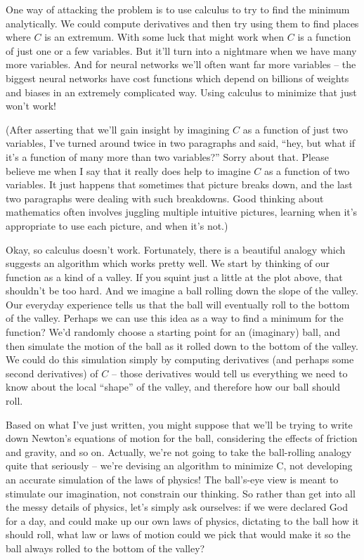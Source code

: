 \documentclass[a4paper,twoside,10pt]{book}
\begin{document}
One way of attacking the problem is to use calculus to try to find the minimum analytically. We could compute derivatives and then try using them to find places where $C$ is an extremum. With some luck that might work when $C$ is a function of just one or a few variables. But it'll turn into a nightmare when we have many more variables. And for neural networks we'll often want far more variables -- the biggest neural networks have cost functions which depend on billions of weights and biases in an extremely complicated way. Using calculus to minimize that just won't work!

(After asserting that we'll gain insight by imagining $C$ as a function of just two variables, I've turned around twice in two paragraphs and said, ``hey, but what if it's a function of many more than two variables?'' Sorry about that. Please believe me when I say that it really does help to imagine $C$ as a function of two variables. It just happens that sometimes that picture breaks down, and the last two paragraphs were dealing with such breakdowns. Good thinking about mathematics often involves juggling multiple intuitive pictures, learning when it's appropriate to use each picture, and when it's not.)

\label{gradient_descent}
Okay, so calculus doesn't work. Fortunately, there is a beautiful analogy which suggests an algorithm which works pretty well. We start by thinking of our function as a kind of a valley. If you squint just a little at the plot above, that shouldn't be too hard. And we imagine a ball rolling down the slope of the valley. Our everyday experience tells us that the ball will eventually roll to the bottom of the valley. Perhaps we can use this idea as a way to find a minimum for the function? We'd randomly choose a starting point for an (imaginary) ball, and then simulate the motion of the ball as it rolled down to the bottom of the valley. We could do this simulation simply by computing derivatives (and perhaps some second derivatives) of $C$ -- those derivatives would tell us everything we need to know about the local ``shape'' of the valley, and therefore how our ball should roll.

Based on what I've just written, you might suppose that we'll be trying to write down Newton's equations of motion for the ball, considering the effects of friction and gravity, and so on. Actually, we're not going to take the ball-rolling analogy quite that seriously -- we're devising an algorithm to minimize C, not developing an accurate simulation of the laws of physics! The ball's-eye view is meant to stimulate our imagination, not constrain our thinking. So rather than get into all the messy details of physics, let's simply ask ourselves: if we were declared God for a day, and could make up our own laws of physics, dictating to the ball how it should roll, what law or laws of motion could we pick that would make it so the ball always rolled to the bottom of the valley?
\end{document}
